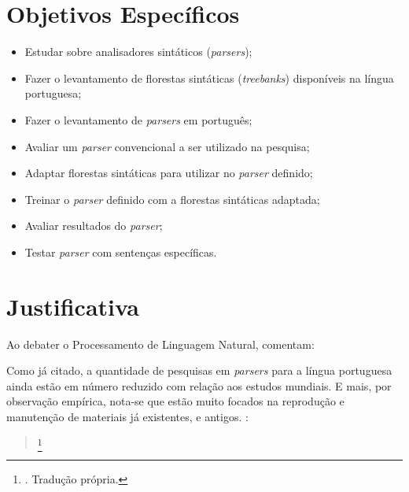 \section{Objetivos Específicos}\label{sec:objetivos-especificos}
\begin{itemize}
    \item Estudar sobre analisadores sintáticos (\textit{parsers});
    \item Fazer o levantamento de florestas sintáticas (\textit{treebanks}) disponíveis na língua portuguesa;
    \item Fazer o levantamento de \textit{parsers} em português;
    \item Avaliar um \textit{parser} convencional a ser utilizado na pesquisa;
    \item Adaptar florestas sintáticas para utilizar no \textit{parser} definido;
    \item Treinar o \textit{parser} definido com a florestas sintáticas adaptada;
    \item Avaliar resultados do \textit{parser};
    \item Testar \textit{parser} com sentenças específicas.
    
\end{itemize}

\section{Justificativa}	
\label{justificativa}

Ao debater o Processamento de Linguagem Natural,  comentam:
\begin{quote}
\end{quote}

Como já citado, a quantidade de pesquisas em \textit{parsers} para a língua portuguesa ainda estão em número reduzido com relação aos estudos mundiais. E mais, por observação empírica, nota-se que estão muito focados na reprodução e manutenção de materiais já existentes, e antigos.
\cite[p~371]{Manning1999FoundationsNLP}:
\begin{quote}
    \footnote{. Tradução própria.}
\end{quote}

